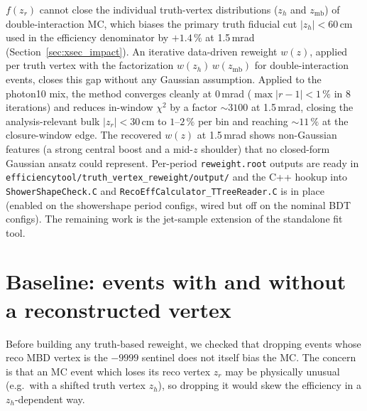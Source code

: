 \documentclass[11pt,a4paper]{article}
\begin{document}
$f(z_r)$ cannot close the individual truth-vertex distributions ($z_h$
and $z_\mathrm{mb}$) of double-interaction MC, which biases the primary
truth fiducial cut $|z_h|<60$\,cm used in the efficiency denominator by
$+1.4\,\%$ at 1.5\,mrad
(Section~\ref{sec:xsec_impact}). An iterative data-driven reweight
$w(z)$, applied per truth vertex with the factorization
$w(z_h)\,w(z_\mathrm{mb})$ for double-interaction events, closes this
gap without any Gaussian assumption. Applied to the photon10 mix, the
method converges cleanly at 0\,mrad ($\max|r\!-\!1|\!<\!1\,\%$ in 8
iterations) and reduces in-window $\chi^2$ by a factor $\sim\!3100$
at 1.5\,mrad, closing the analysis-relevant bulk $|z_r|\!<\!30$\,cm to
$1$--$2\,\%$ per bin and reaching $\sim\!11\,\%$ at the closure-window
edge. The recovered $w(z)$ at 1.5\,mrad shows non-Gaussian features
(a strong central boost and a mid-$z$ shoulder) that no closed-form
Gaussian ansatz could represent. Per-period
\texttt{reweight.root} outputs are ready in
\texttt{efficiencytool/truth\_vertex\_reweight/output/} and the C++
hookup into \texttt{ShowerShapeCheck.C} and
\texttt{RecoEffCalculator\_TTreeReader.C} is in place (enabled on the
showershape period configs, wired but off on the nominal BDT
configs). The remaining work is the jet-sample extension of the
standalone fit tool.

\appendix

\section{Baseline: events with and without a reconstructed vertex}
\label{app:nonull}

Before building any truth-based reweight, we checked that dropping
events whose reco MBD vertex is the $-9999$ sentinel does not itself
bias the MC. The concern is that an MC event which loses its reco
vertex $z_r$ may be physically unusual (e.g.\ with a shifted truth
vertex $z_h$), so dropping it would skew the efficiency in a
$z_h$-dependent way.
\end{document}
